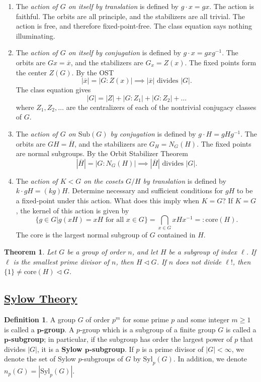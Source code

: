 \documentclass[11pt]{amsart}
\newtheorem*{theorem*}{Theorem}
\theoremstyle{definition}
\newtheorem*{definition*}{Definition}
\renewcommand\geq{\geqslant}
\renewcommand\:{\colon}
\renewcommand\bar[1]{\overline{#1}}
\newcommand{\1}{\mathds{1}}
\newcommand{\core}{\text{core}}
\newcommand{\Sub}{\text{Sub}}
\newcommand{\Syl}{\text{Syl}}
\begin{document}
\begin{enumerate}[leftmargin=22.5pt]\setlength\itemsep{0em}
	\item The \textit{action of $G$ on itself by translation} is defined by $g\cdot x = gx$. The action is faithful. The orbits are all principle, and the stabilizers are all trivial. The action is free, and therefore fixed-point-free. The class equation says nothing illuminating.
	\item The \textit{action of $G$ on itself by conjugation} is defined by $g \cdot x = gxg^{-1}$. The orbits are $Gx = \bar{x}$, and the stabilizers are $G_x = Z(x)$. The fixed points form the center $Z(G)$. By the OST \[ |\bar{x}| = |G : Z(x)| \implies |\bar{x}| \text{ divides } |G|. \] The class equation gives \[ |G| = |Z| + |G:Z_1| + |G:Z_2| + \dots \] where $Z_1, Z_2, \dots$ are the centralizers of each of the nontrivial conjugacy classes of $G$.
	\item The \textit{action of $G$ on $\Sub(G)$ by conjugation} is defined by $g \cdot H = gHg^{-1}$. The orbits are $GH = \bar{H}$, and the stabilizers are $G_H = N_G(H)$. The fixed points are normal subgroups. By the Orbit Stabilizer Theorem 
		\[ |\bar{H}| = |G : N_G(H)| \implies |\bar{H}| \text{ divides } |G|. \]
	\item The \textit{action of $K < G$ on the cosets $G/H$ by translation} is defined by $k \cdot gH = (kg)H$. Determine necessary and sufficient conditions for $gH$ to be a fixed-point under this action. What does this imply when $K = G$?
	If $K = G$, the kernel of this action is given by
		\[ \{g \in G | g(xH) = xH \text{ for all } x \in G \} = \bigcap_{x \in G} xHx^{-1} =: \core(H). \]
	The core is the largest normal subgroup of $G$ contained in $H$.
\end{enumerate}

\begin{theorem*}
	Let $G$ be a group of order $n$, and let $H$ be a subgroup of index $\ell$. If $\ell$ is the smallest prime divisor of $n$, then $H \triangleleft G$. If $n$ does not divide $\ell!$, then $\{1\} \neq \core(H) \triangleleft G$.
\end{theorem*}

\vskip20pt



\subsection*{\underline{Sylow Theory}}

\begin{definition*}
	A group $G$ of order $p^m$ for some prime $p$ and some integer $m \geq 1$ is called a \textbf{$\boldsymbol{p}$-group}. A $p$-group which is a subgroup of a finite group $G$ is called a \textbf{$\boldsymbol{p}$-subgroup}; in particular, if the subgroup has order the largest power of $p$ that divides $|G|$, it is a \textbf{Sylow $\boldsymbol{p}$-subgroup}. If $p$ is a prime divisor of $|G| < \infty$, we denote the set of Sylow $p$-subgroups of $G$ by $\Syl_p(G)$. In addition, we denote $n_p(G) = |\Syl_p(G)|$. 
\end{definition*}
\end{document}
